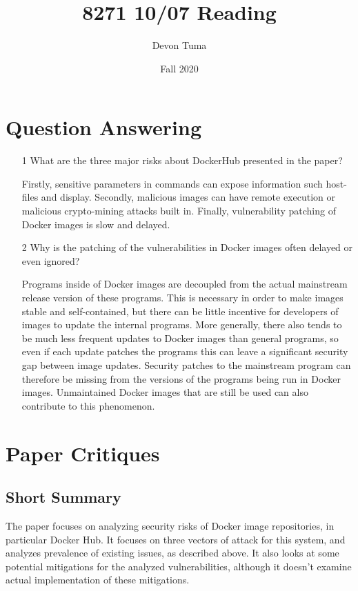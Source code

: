 \documentclass[11pt]{article}
\title{8271 10/07 Reading}
\author{Devon Tuma}
\date{Fall 2020}
\begin{document}
\maketitle

\section*{Question Answering}

\begin{itemize}
\item [1] What are the three major risks about DockerHub presented in the paper?

  Firstly, sensitive parameters in commands can expose information such host-files and display.
  Secondly, malicious images can have remote execution or malicious crypto-mining attacks built in.
  Finally, vulnerability patching of Docker images is slow and delayed.
  
\item [2] Why is the patching of the vulnerabilities in Docker images often delayed or even ignored?

  Programs inside of Docker images are decoupled from the actual mainstream release version of these programs.
  This is necessary in order to make images stable and self-contained, but there can be little incentive for developers of images to update the internal programs.
  More generally, there also tends to be much less frequent updates to Docker images than general programs, so even if each update patches the programs this can leave a significant security gap between image updates.
  Security patches to the mainstream program can therefore be missing from the versions of the programs being run in Docker images.
  Unmaintained Docker images that are still be used can also contribute to this phenomenon.
\end{itemize}

\section*{Paper Critiques}

\subsection*{Short Summary}

The paper focuses on analyzing security risks of Docker image repositories, in particular Docker Hub.
It focuses on three vectors of attack for this system, and analyzes prevalence of existing issues, as described above.
It also looks at some potential mitigations for the analyzed vulnerabilities, although it doesn't examine actual implementation of these mitigations.
\end{document}
